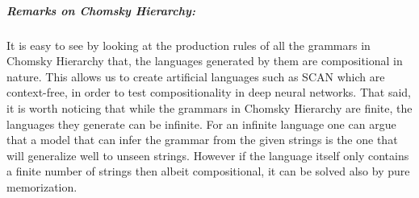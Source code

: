 \subparagraph{Remarks on Chomsky Hierarchy:}It is easy to see by looking at the production rules of all the grammars in Chomsky Hierarchy that, the languages generated by them are compositional in nature. This allows us to create artificial languages such as SCAN \citep{Lake2017} which are context-free, in order to test compositionality in deep neural networks. That said, it is worth noticing that while the grammars in Chomsky Hierarchy are finite, the languages they generate can be infinite. For an infinite language one can argue that a model that can infer the grammar from the given strings is the one that will generalize well to unseen strings. However if the language itself only contains a finite number of strings then albeit compositional, it can be solved also by pure memorization.
